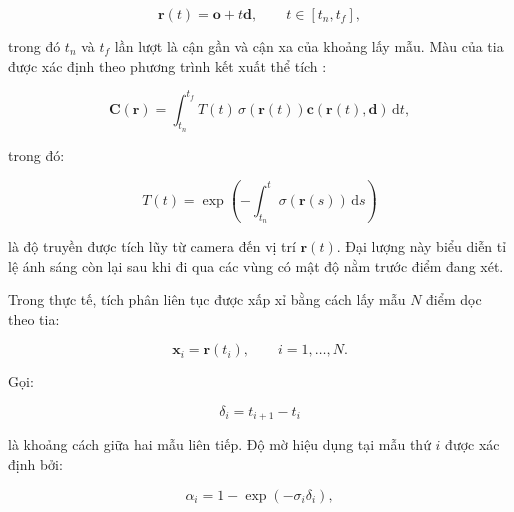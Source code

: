 \begin{equation}
    \mathbf{r}(t)
    =
    \mathbf{o}
    +
    t\mathbf{d},
    \qquad
    t\in[t_n,t_f],
    \label{eq:nerf-camera-ray}
\end{equation}

trong đó $t_n$ và $t_f$ lần lượt là cận gần và cận xa của khoảng lấy mẫu. Màu của tia được xác định theo phương trình kết xuất thể tích \cite{max1995optical}:

\begin{equation}
    \mathbf{C}
    \left(
        \mathbf{r}
    \right)
    =
    \int_{t_n}^{t_f}
    T(t)\,
    \sigma
    \left(
        \mathbf{r}(t)
    \right)
    \mathbf{c}
    \left(
        \mathbf{r}(t),
        \mathbf{d}
    \right)
    \,\mathrm{d}t,
    \label{eq:nerf-continuous-volume-rendering}
\end{equation}

trong đó:

\begin{equation}
    T(t)
    =
    \exp
    \left(
        -
        \int_{t_n}^{t}
        \sigma
        \left(
            \mathbf{r}(s)
        \right)
        \,\mathrm{d}s
    \right)
    \label{eq:nerf-continuous-transmittance}
\end{equation}

là độ truyền được tích lũy từ camera đến vị trí $\mathbf{r}(t)$. Đại lượng này biểu diễn tỉ lệ ánh sáng còn lại sau khi đi qua các vùng có mật độ nằm trước điểm đang xét.

Trong thực tế, tích phân liên tục được xấp xỉ bằng cách lấy mẫu $N$ điểm dọc theo tia:

\begin{equation}
    \mathbf{x}_i
    =
    \mathbf{r}(t_i),
    \qquad
    i=1,\ldots,N.
    \label{eq:nerf-ray-samples}
\end{equation}

Gọi:

\begin{equation}
    \delta_i
    =
    t_{i+1}-t_i
    \label{eq:nerf-sampling-interval}
\end{equation}

là khoảng cách giữa hai mẫu liên tiếp. Độ mờ hiệu dụng tại mẫu thứ $i$ được xác định bởi:

\begin{equation}
    \alpha_i
    =
    1-
    \exp
    \left(
        -\sigma_i\delta_i
    \right),
    \label{eq:nerf-sample-alpha}
\end{equation}

